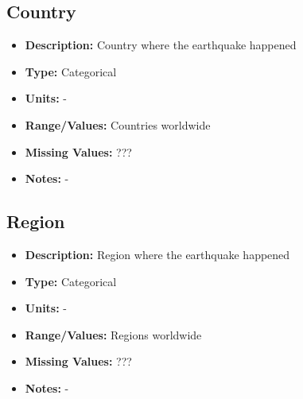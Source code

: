 \documentclass{article}
\begin{document}
\begin{comment}
\end{comment}

\subsection{Country}
\begin{itemize}
    \item \textbf{Description:} Country where the earthquake happened
    \item \textbf{Type:} Categorical
    \item \textbf{Units:} -
    \item \textbf{Range/Values:} Countries worldwide
    \item \textbf{Missing Values:} ???
    \item \textbf{Notes:} -
\end{itemize}

\begin{comment}

\subsection{Location Name}
\begin{itemize}
    \item \textbf{Description:} Location where the earthquake happened (with country and location name)
    \item \textbf{Type:} String ???
    \item \textbf{Units:} -
    \item \textbf{Range/Values:} -
    \item \textbf{Missing Values:} ???
    \item \textbf{Notes:} -
\end{itemize}

\end{comment}

\subsection{Region}
\begin{itemize}
    \item \textbf{Description:} Region where the earthquake happened
    \item \textbf{Type:} Categorical
    \item \textbf{Units:} -
    \item \textbf{Range/Values:} Regions worldwide
    \item \textbf{Missing Values:} ???
    \item \textbf{Notes:} -
\end{itemize}
\end{document}
